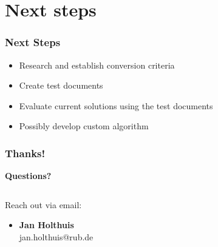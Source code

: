 \documentclass[
    alternativetitlepage=alternativ,
    cornerlogo=hgi_nds_logo2,
    sectionoverview,
]{rubpresentation}
\begin{document}
\section{Next steps}

\begin{frame}
    \frametitle{Next Steps}
    \begin{itemize}
        \item{} Research and establish conversion criteria
        \item{} Create test documents
        \item{} Evaluate current solutions using the test documents
        \item{} Possibly develop custom algorithm
    \end{itemize}
\end{frame}


\begin{frame}[plain]
\frametitle{Thanks!}
 \begin{center}
 {\bfseries\fontsize{30pt}{1.2em}\selectfont Questions?}
 \end{center}
  \begin{columns}
    \begin{column}{0.5\textwidth}
      \begin{center}
        Reach out via email:
        \begin{itemize}
        \item \textbf{Jan Holthuis}\\
              jan.holthuis@rub.de
        \end{itemize}
      \end{center}
    \end{column}
    \begin{column}{0.5\textwidth}
      \begin{center}
      \end{center}
    \end{column}
  \end{columns}
\end{frame}
\end{document}
